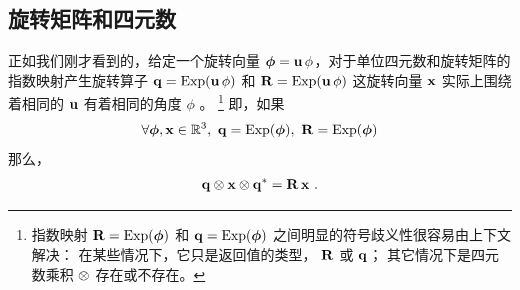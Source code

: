



\subsection{旋转矩阵和四元数}

正如我们刚才看到的，给定一个旋转向量 ${\bm \phi}={\bf u}\,\phi$，对于单位四元数和旋转矩阵的指数映射产生旋转算子 
${\bf q}=\operatorname*{Exp}({\bf u}\,\phi)$ 
和
${\bf R}=\operatorname*{Exp}({\bf u}\,\phi)$ 
这旋转向量 ${\bf x}$ 实际上围绕着相同的 ${\bf u}$ 有着相同的角度 $\phi$ 。%
%
\footnote{指数映射 ${\bf R}=\operatorname*{Exp}({\bm \phi})$ 和 ${\bf q} = \operatorname*{Exp}({\bm \phi})$ 之间明显的符号歧义性很容易由上下文解决：
在某些情况下，它只是返回值的类型， ${\bf R}$ 或 ${\bf q}$； 
其它情况下是四元数乘积 $\otimes$ 存在或不存在。}
即，如果
%
\begin{align}
\forall {\bm \phi},{\bf x} \in {\mathbb R}^3,~ 
{\bf q} = \operatorname*{Exp}({\bm \phi}) 
,~ 
{\bf R}=\operatorname*{Exp}({\bm \phi})
\end{align}
%
%
%
%
那么，
%
\begin{align}
{\bf q}\otimes{\bf x}\otimes{\bf q}^* = {\bf R}\,{\bf x}~.
\end{align}
